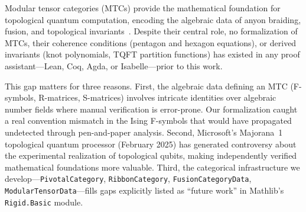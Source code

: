 \documentclass[12pt]{article}
\newcommand{\lean}[1]{\texttt{#1}}
\begin{document}
Modular tensor categories (MTCs) provide the mathematical foundation for topological quantum computation, encoding the algebraic data of anyon braiding, fusion, and topological invariants~\cite{kitaev2006,rowell2009}. Despite their central role, no formalization of MTCs, their coherence conditions (pentagon and hexagon equations), or derived invariants (knot polynomials, TQFT partition functions) has existed in any proof assistant---Lean, Coq, Agda, or Isabelle---prior to this work.

This gap matters for three reasons. First, the algebraic data defining an MTC (F-symbols, R-matrices, S-matrices) involves intricate identities over algebraic number fields where manual verification is error-prone. Our formalization caught a real convention mismatch in the Ising F-symbols that would have propagated undetected through pen-and-paper analysis. Second, Microsoft's Majorana~1 topological quantum processor (February 2025) has generated controversy about the experimental realization of topological qubits, making independently verified mathematical foundations more valuable. Third, the categorical infrastructure we develop---\lean{PivotalCategory}, \lean{RibbonCategory}, \lean{FusionCategoryData}, \lean{ModularTensorData}---fills gaps explicitly listed as ``future work'' in Mathlib's \lean{Rigid.Basic} module.
\end{document}
